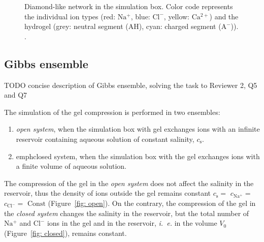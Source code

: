 \documentclass[journal,article,submit,pdftex,moreauthors]{Definitions/mdpi}
\newcommand{\ie}{\textit{i.~e.} }
\newcommand{\cna}{c_\mathrm{Na^+}}
\newcommand{\ccl}{c_\mathrm{Cl^-}}
\newcommand{\A}{\mathrm{A^-}}
\newcommand{\AH}{\mathrm{AH}}
\newcommand{\cl}{\mathrm{Cl^-}}
\newcommand{\na}{\mathrm{Na^+}}
\newcommand{\ca}{\mathrm{Ca^{2+}}}
\newcommand{\cs}{c_{\mathrm{s}}}
\newcommand{\Vbox}{V_0}
\newcommand{\reffig}[1]{Figure~\ref{#1}}
\begin{document}
\begin{figure}[h]
\centering 
{}
\caption{Diamond-like network in the simulation box. Color code represents
the individual ion types (red: $\na$, blue: $\cl$, yellow: $\ca$)
and the hydrogel (grey: neutral segment ($\AH$), cyan: charged segment
($\A$)). \label{fig:open and closed}.}
\end{figure}

\subsection{Gibbs ensemble}
TODO concise description of Gibbs ensemble, solving the task to Reviewer 2, Q5 and Q7

The simulation of the gel compression is performed in two ensembles:
\begin{enumerate}
\item \emph{open system}, when the simulation box with gel exchanges ions with an infinite 
reservoir containing aqueous solution of constant salinity, $\cs$. 
\item emph{closed system}, when the simulation box with the gel exchanges ions with a finite volume of aqueous solution.
\end{enumerate}
The compression of the gel in the \emph{open system} does not affect the salinity in the 
reservoir, thus the density of ions outside the gel remains constant 
$\cs =$ $\cna=$ $\ccl=$ $\text{Const}$ (\reffig{fig: open}). 
On the contrary, the compression of the gel in the \emph{closed system} changes the salinity in the reservoir, but the total number of $\na$ and $\cl$ ions in the gel and in the reservoir, \ie in the volume $\Vbox$ (\reffig{fig: closed}), remains constant.
\end{document}

